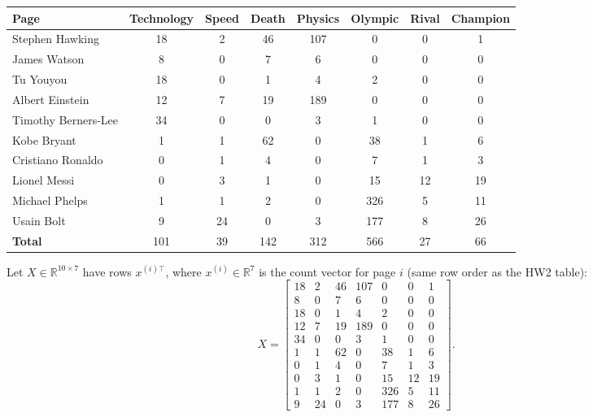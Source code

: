 \documentclass[fleqn]{article}
\begin{document}
    \medskip
    \begin{center}
    \begin{tabular}{l|ccccccc}
        \hline
        Page & Technology & Speed & Death & Physics & Olympic & Rival & Champion \\
        \hline
        Stephen Hawking & 18 & 2 & 46 & 107 & 0 & 0 & 1 \\
        James Watson & 8 & 0 & 7 & 6 & 0 & 0 & 0 \\
        Tu Youyou & 18 & 0 & 1 & 4 & 2 & 0 & 0 \\
        Albert Einstein & 12 & 7 & 19 & 189 & 0 & 0 & 0 \\
        Timothy Berners-Lee & 34 & 0 & 0 & 3 & 1 & 0 & 0 \\
        Kobe Bryant & 1 & 1 & 62 & 0 & 38 & 1 & 6 \\
        Cristiano Ronaldo & 0 & 1 & 4 & 0 & 7 & 1 & 3 \\
        Lionel Messi & 0 & 3 & 1 & 0 & 15 & 12 & 19 \\
        Michael Phelps & 1 & 1 & 2 & 0 & 326 & 5 & 11 \\
        Usain Bolt & 9 & 24 & 0 & 3 & 177 & 8 & 26 \\
        \hline
        \textbf{Total} & 101 & 39 & 142 & 312 & 566 & 27 & 66 \\
        \hline
    \end{tabular}
    \end{center}
    
    \medskip
    \noindent Let $X\in\mathbb{R}^{10\times 7}$ have rows $x^{(i)\top}$, where $x^{(i)}\in\mathbb{R}^7$ is the count vector for page $i$ (same row order as the HW2 table):
    \[
    X=
    \begin{bmatrix}
        18 & 2 & 46 & 107 & 0 & 0 & 1 \\
        8 & 0 & 7 & 6 & 0 & 0 & 0 \\
        18 & 0 & 1 & 4 & 2 & 0 & 0 \\
        12 & 7 & 19 & 189 & 0 & 0 & 0 \\
        34 & 0 & 0 & 3 & 1 & 0 & 0 \\
        1 & 1 & 62 & 0 & 38 & 1 & 6 \\
        0 & 1 & 4 & 0 & 7 & 1 & 3 \\
        0 & 3 & 1 & 0 & 15 & 12 & 19 \\
        1 & 1 & 2 & 0 & 326 & 5 & 11 \\
        9 & 24 & 0 & 3 & 177 & 8 & 26
    \end{bmatrix}.
    \]
    
\end{document}
